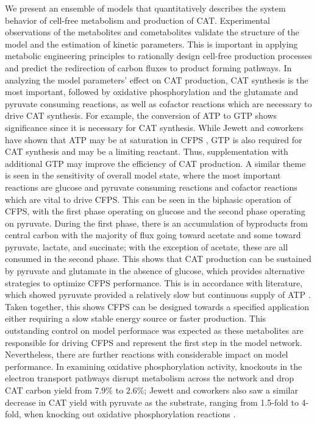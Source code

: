 \documentclass[12pt]{article}
\begin{document}
We present an ensemble of models that quantitatively describes the system behavior of cell-free metabolism and production of CAT.
Experimental observations of the metabolites and cometabolites validate the structure of the model and the estimation of kinetic parameters.
This is important in applying metabolic engineering principles to rationally design cell-free production processes and predict the redirection of carbon fluxes to product forming pathways.
In analyzing the model parameters' effect on CAT production, CAT synthesis is the most important, followed by oxidative phosphorylation and the glutamate and pyruvate consuming reactions, as well as cofactor reactions which are necessary to drive CAT synthesis.
For example, the conversion of ATP to GTP shows significance since it is necessary for CAT synthesis.
While Jewett and coworkers have shown that ATP may be at saturation in CFPS \cite{Jewett:2008aa}, GTP is also required for CAT synthesis and may be a limiting reactant.
Thus, supplementation with additional GTP may improve the efficiency of CAT production.
A similar theme is seen in the sensitivity of overall model state, where the most important reactions are glucose and pyruvate consuming reactions and cofactor reactions which are vital to drive CFPS.
This can be seen in the biphasic operation of CFPS, with the first phase operating on glucose and the second phase operating on pyruvate.
During the first phase, there is an accumulation of byproducts from central carbon with the majority of flux going toward acetate and some toward pyruvate, lactate, and succinate; with the exception of acetate, these are all consumed in the second phase.
This shows that CAT production can be sustained by pyruvate and glutamate in the absence of glucose, which provides alternative strategies to optimize CFPS performance.
This is in accordance with literature, which showed pyruvate provided a relatively slow but continuous supply of ATP \cite{swartz_nature2001}.
Taken together, this shows CFPS can be designed towards a specified application either requiring a slow stable energy source or faster production.
This outstanding control on model performace was expected as these metabolites are responsible for driving CFPS and represent the first step in the model network.
Nevertheless, there are further reactions with considerable impact on model performance.
In examining oxidative phosphorylation activity, knockouts in the electron transport pathways disrupt metabolism across the network and drop CAT carbon yield from 7.9\% to 2.6\%; Jewett and coworkers also saw a similar decrease in CAT yield with pyruvate as the substrate, ranging from 1.5-fold to 4-fold, when knocking out oxidative phosphorylation reactions \cite{Jewett:2008aa}.
\end{document}
